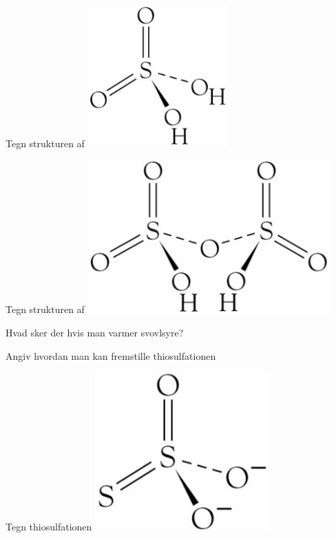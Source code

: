 \begin{flashcard}[Struktur]{Tegn strukturen af }
\includegraphics[width=0.4\textwidth]{figures/k16s438H2SO4.png}
\end{flashcard}

\begin{flashcard}[Struktur]{Tegn strukturen af }
\includegraphics[width=0.7\textwidth]{figures/k16s439H2S2O7.png}
\end{flashcard}

\begin{flashcard}[Reaktion]{Hvad sker der hvis man varmer svovlsyre?}
\end{flashcard}

\begin{flashcard}[Fremstilling]{Angiv hvordan man kan fremstille thiosulfationen}
\end{flashcard}

\begin{flashcard}[Struktur]{Tegn thiosulfationen}
\includegraphics[width=0.5\textwidth]{figures/k16s442S2O32-.png}
\end{flashcard}

